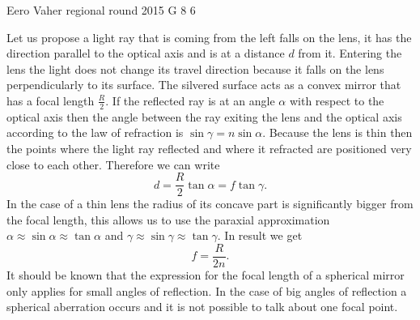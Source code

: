 \documentclass[11pt]{article}
\begin{document}
{Eero Vaher} %
{regional round} %
{2015} %
{G 8} %
{6} %
{

\ifEngSolution
Let us propose a light ray that is coming from the left falls on the lens, it has the direction parallel to the optical axis and is at a distance $d$ from it. Entering the lens the light does not change its travel direction because it falls on the lens perpendicularly to its surface. The silvered surface acts as a convex mirror that has a focal length $\frac{R}{2}$. If the reflected ray is at an angle $\alpha$ with respect to the optical axis then the angle between the ray exiting the lens and the optical axis according to the law of refraction is $\sin\gamma=n\sin\alpha$. Because the lens is thin then the points where the light ray reflected and where it refracted are positioned very close to each other. Therefore we can write
\[ d=\frac{R}{2}\tan\alpha=f\tan\gamma. \] 
In the case of a thin lens the radius of its concave part is significantly bigger from the focal length, this allows us to use the paraxial approximation $\alpha\approx\sin\alpha\approx\tan\alpha$ and $\gamma\approx\sin\gamma\approx\tan\gamma$. In result we get
\[ f=\frac{R}{2n}. \] 
It should be known that the expression for the focal length of a spherical mirror only applies for small angles of reflection. In the case of big angles of reflection a spherical aberration occurs and it is not possible to talk about one focal point. 
\begin{center}
\end{center}
\fi
}
\end{document}

